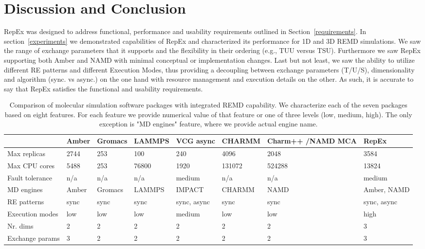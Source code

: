 \documentclass{sig-alternate-05-2015}
\begin{document}
\section{Discussion and Conclusion} \label{discussion}

RepEx was designed to address functional, performance and usability requirements outlined in Section~\ref{requirements}. In section~\ref{experiments} we demonstrated capabilities of RepEx and characterized its performance for 1D and 3D REMD simulations. We saw the range of exchange parameters that it supports and the flexibility in their ordering (e.g., TUU versus TSU). Furthermore we saw RepEx supporting both Amber and NAMD with minimal conceptual or implementation changes. Last but not least, we saw the ability to utilize different RE patterns and different Execution Modes, thus providing a decoupling between exchange parameters (T/U/S), dimensionality and algorithm (sync. vs async.) on the one hand with resource management and execution details on the other. As such, it is accurate to say that RepEx satisfies the functional and usability requirements.

\begin{table*}[ht!]
  \begin{center}
  \begin{tabular}{| p{2.5cm} || p{1.2cm}| p{1.4cm} | p{1.6cm} | p{1.8cm} | p{1.8cm} | p{2.4cm} | p{1.6cm} |} 
  \hline
   & \textbf{Amber} & \textbf{Gromacs} & \textbf{LAMMPS} & \textbf{VCG async} & \textbf{CHARMM} & \textbf{Charm++ /NAMD MCA} & \textbf{RepEx}\\
  \hline
  \hline
  Max replicas & 2744 & 253 & 100 & 240 & 4096 & 2048 & 3584 \\ 
  \hline
  Max CPU cores & 5488 & 253 & 76800 & 1920 & 131072 & 524288 & 13824 \\ 
  \hline
  Fault tolerance & n/a & n/a & n/a & medium & n/a & n/a & medium \\  
  \hline
  MD engines & Amber & Gromacs & LAMMPS & IMPACT & CHARMM & NAMD & Amber, NAMD \\  
  \hline
  RE patterns & sync & sync & sync & sync, async & sync & sync & sync, async \\ 
  \hline
  Execution modes & low & low & low & medium & low & low & high \\ 
  \hline
  Nr. dims & 2 & 2 & 2 & 2 & 2 & 2 & 3 \\ 
  \hline
  Exchange params & 3 & 2 & 2 & 2 & 2 & 2 & 3 \\ 
  \hline
  \end{tabular}
  \end{center}
  \caption{\small{Comparison of molecular simulation software packages with integrated REMD capability. We characterize each of the seven packages based on eight features. For each feature we provide numerical value of that feature or one of three levels (low, medium, high). The only exception is "MD engines" feature, where we provide actual engine name.}}\label{table:compare}
\end{table*}
\end{document}
